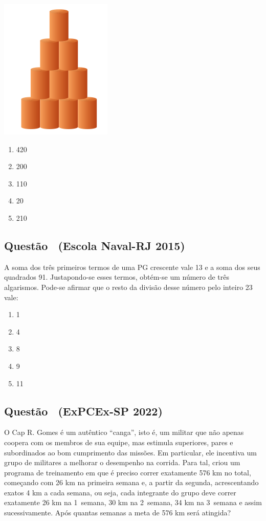 \documentclass[12pt]{article}
\newcounter{questao}
\newcommand{\novaquestao}[1]{%
  \stepcounter{questao}%
  \subsection*{Questão \thequestao\ (#1)}%
}
\begin{document}
\begin{multicols}{2}
            \begin{center}
                \includegraphics[scale=0.6]{q36.png}
            \end{center}
        
            \begin{enumerate}[label=(\alph*), noitemsep]
                \item 420
                \item 200
                \item 110
                \item 20
                \item 210
            \end{enumerate}

        \novaquestao{Escola Naval-RJ 2015}
            A soma dos três primeiros termos de uma PG crescente vale 13 e a soma dos seus quadrados 91. Justapondo-se esses termos, obtém-se um número de três algarismos. Pode-se afirmar que o resto da divisão desse número pelo inteiro 23 vale:

            \begin{enumerate}[label=(\alph*), noitemsep]
                \item 1
                \item 4
                \item 8
                \item 9
                \item 11
            \end{enumerate}
        
        \novaquestao{ExPCEx-SP 2022}
            O Cap R. Gomes é um autêntico “canga”, isto é, um militar que não apenas coopera com os membros de sua equipe, mas estimula superiores, pares e subordinados ao bom cumprimento das missões. Em particular, ele incentiva um grupo de militares a melhorar o desempenho na corrida. 
            Para tal, criou um programa de treinamento em que é preciso correr exatamente 576 km no total, começando com 26 km na primeira semana e, a partir da segunda, acrescentando exatos 4 km a cada semana, ou seja, cada integrante do grupo deve correr exatamente 26 km na 1\textordfeminine\ semana, 30 km na 2\textordfeminine\  semana, 34 km na 3\textordfeminine\ semana e assim sucessivamente. 
            Após quantas semanas a meta de 576 km será atingida?


\end{multicols}
\end{document}
